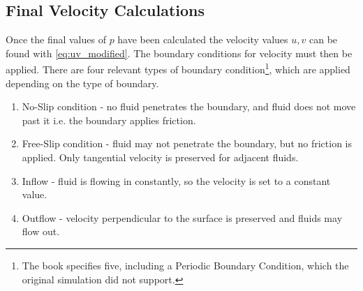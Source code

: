 \subsection{Final Velocity Calculations}
Once the final values of $p$ have been calculated the velocity values $u,v$ can be found with \cref{eq:uv_modified}.
The boundary conditions for velocity must then be applied.
There are four relevant types of boundary condition\footnote{The book specifies five, including a Periodic Boundary Condition, which the original simulation did not support.}, which are applied depending on the type of boundary.
\begin{enumerate}
    \item No-Slip condition - no fluid penetrates the boundary, and fluid does not move past it i.e. the boundary applies friction.
    \item Free-Slip condition - fluid may not penetrate the boundary, but no friction is applied. Only tangential velocity is preserved for adjacent fluids.
    \item Inflow - fluid is flowing in constantly, so the velocity is set to a constant value. 
    \item Outflow - velocity perpendicular to the surface is preserved and fluids may flow out.
\end{enumerate}

